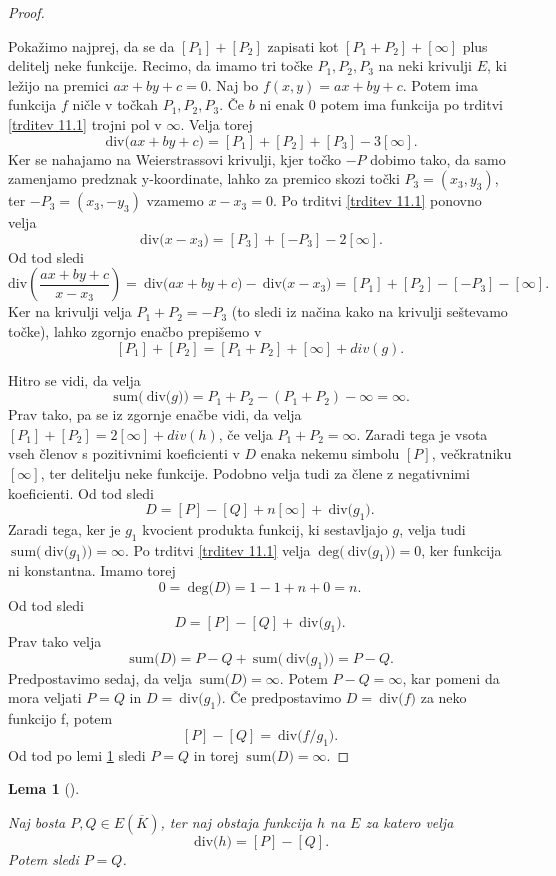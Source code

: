 \documentclass[12pt,a4paper,twoside]{article}
\theoremstyle{definition} %
\theoremstyle{plain} %
\newtheorem{lema}[definicija]{Lema}
\numberwithin{equation}{section}  %
\newcommand{\E}[1]{E({#1})}
\newcommand{\DEG}[1]{\ \text{deg(}{#1}\text{)}}
\newcommand{\Div}[1]{\ \text{div(}{#1}\text{)}}
\newcommand{\SUM}[1]{\ \text{sum(}{#1}\text{)}}
\begin{document}
\begin{proof}~

Pokažimo najprej, da se da $[P_1]+ [P_2]$ zapisati kot $[P_1+P_2] + [\infty]$ plus delitelj neke funkcije.
Recimo, da imamo tri točke $P_1,P_2,P_3$ na neki krivulji $E$, ki ležijo na premici $ax+by+c = 0$.
Naj bo $f(x,y) = ax+by+c$. Potem ima funkcija $f$ ničle v točkah $P_1,P_2,P_3$. Če $b$ ni enak $0$ potem ima funkcija po trditvi \ref{trditev 11.1} trojni pol v $\infty$.
Velja torej $$\Div{ax+by+c} = [P_1]+[P_2]+[P_3]-3[\infty].$$
Ker se nahajamo na Weierstrassovi krivulji, kjer točko $-P$ dobimo tako, da samo zamenjamo predznak y-koordinate, lahko za premico skozi točki $P_3 = (x_3,y_3)$, ter $-P_3=(x_3,-y_3)$ vzamemo $x-x_3=0$.
Po  trditvi \ref{trditev 11.1} ponovno velja
$$\Div{x-x_3} = [P_3]+[-P_3]-2[\infty].$$
Od tod sledi
$$\text{div}\left( \frac{ax+by+c}{x-x_3}\right) = \Div{ax+by+c} - \Div{x-x_3} =[P_1]+[P_2]-[-P_3]-[\infty].$$
Ker na krivulji velja $P_1+P_2 = -P_3$ (to sledi iz načina kako na krivulji seštevamo točke), lahko zgornjo enačbo prepišemo v 
$$[P_1]+[P_2] = [P_1+P_2]+[\infty]+div(g).$$ 


Hitro se vidi, da velja
$$\SUM{\Div{g}}= P_1+P_2-(P_1+P_2)-\infty = \infty.$$
Prav tako, pa se iz zgornje enačbe vidi, da velja $[P_1]+[P_2] = 2[\infty] + div(h)$, če velja $P_1+P_2 = \infty$. Zaradi tega je vsota vseh členov s pozitivnimi koeficienti v $D$ enaka nekemu simbolu $[P]$, večkratniku $[\infty]$, ter delitelju neke funkcije. Podobno velja tudi za člene z negativnimi koeficienti. Od tod sledi
$$D = [P]-[Q]+n[\infty]+\Div{g_1}.$$
Zaradi tega, ker je $g_1$ kvocient produkta funkcij, ki sestavljajo $g$, velja tudi
\newline $\SUM{\Div{g_1}}= \infty$. Po trditvi \ref{trditev 11.1} velja $\DEG{\Div{g_1}}=0$, ker funkcija ni konstantna. Imamo torej $$0 = \DEG{D} = 1-1+n+0=n.$$
Od tod sledi
$$D = [P]-[Q] + \Div{g_1}.$$
Prav tako velja
$$\SUM{D} = P-Q+\SUM{\Div{g_1}} = P-Q.$$
Predpostavimo sedaj, da velja $\SUM{D} = \infty$. Potem $P-Q = \infty$, kar pomeni da mora veljati $P=Q$ in $D = \Div{g_1}$. Če predpostavimo $D = \Div{f}$ za neko funkcijo f, potem
$$[P]-[Q] = \Div{f/g_1}.$$
Od tod po lemi \ref{lema 11.3} sledi $P = Q$ in torej $\SUM{D} = \infty$.

\end{proof}

\begin{lema}[]~

\label{lema 11.3}

Naj bosta $P,Q \in \E{\overline{K}}$, ter naj obstaja funkcija $h$ na $E$ za katero velja
$$\Div{h}=[P]-[Q].$$
Potem sledi $P=Q$.
\end{lema}
\newpage
\end{document}

